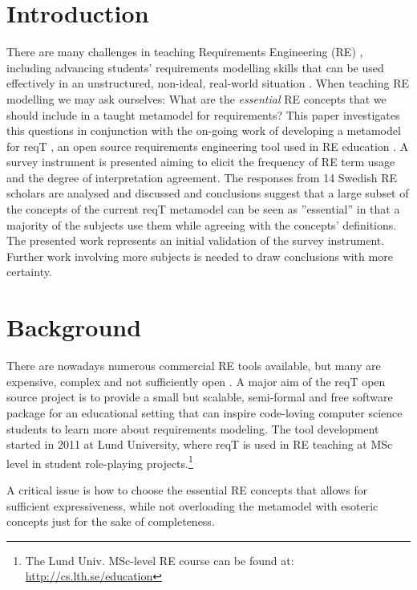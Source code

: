 \documentclass[runningheads,a4paper]{llncs}
\begin{document}
\section{Introduction}
There are many challenges in teaching Requirements Engineering (RE) \cite{Memon2010, Regev2011}, including  advancing students' requirements modelling skills that can be used effectively in an unstructured, non-ideal, real-world situation \cite{Callele2006}. When teaching RE modelling we may ask ourselves: What are the \textit{essential} RE concepts that we should include in a taught metamodel for requirements? This paper investigates this questions in conjunction with the on-going work of developing a metamodel for reqT \cite{reqT}, an open source requirements engineering tool used in RE education  \cite{Regnell2013}.
A survey instrument is presented aiming to elicit the frequency of RE term usage and the degree of interpretation agreement. The responses from 14 Swedish RE scholars are analysed and discussed and conclusions suggest that a large subset of the concepts of the current reqT metamodel can be seen as ''essential'' in that a majority of the subjects use them while agreeing with the concepts' definitions. The presented work represents an initial validation of the survey instrument. Further work involving more subjects is needed to draw conclusions with more certainty. 

\section{Background}

There are nowadays numerous commercial RE tools available, but many are expensive, complex and not sufficiently open  \cite{Carillo2011}. A major aim of the reqT open source project is to provide a small but scalable, semi-formal and free software package for an educational setting \cite{Regnell2013} that can inspire code-loving computer science students to learn more about requirements modeling. The tool development started in 2011 at Lund University, where reqT is used in RE teaching at MSc level in student role-playing projects.\footnote{\label{note:ets170}The Lund Univ. MSc-level RE course can be found at: \scriptsize\url{http://cs.lth.se/education}}

A critical issue is how to choose the essential RE concepts that allows for sufficient expressiveness, while not overloading the metamodel with esoteric concepts just for the sake of completeness. 
\end{document}
